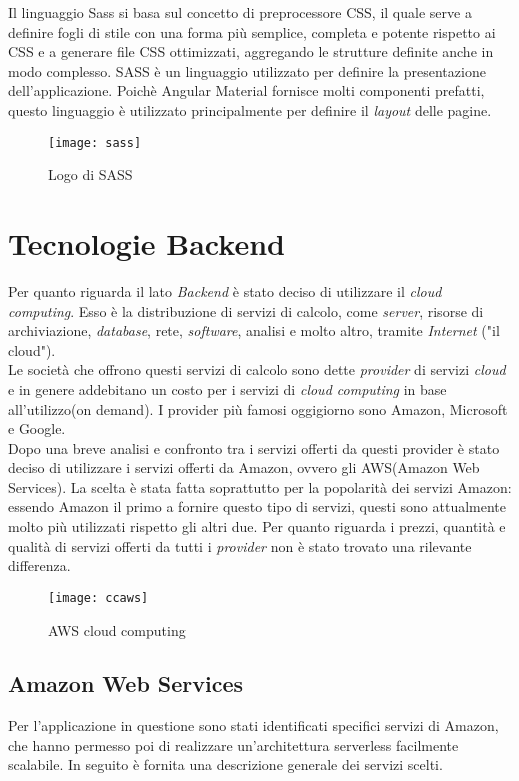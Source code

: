 Il linguaggio Sass si basa sul concetto di preprocessore CSS, il quale serve a definire fogli di stile con una forma più semplice, completa e potente rispetto ai CSS e a generare file CSS ottimizzati, aggregando le strutture definite anche in modo complesso. SASS è un linguaggio utilizzato per definire la presentazione dell'applicazione. Poichè Angular Material fornisce molti componenti prefatti, questo linguaggio è utilizzato principalmente per definire il \emph{layout} delle pagine. 
\begin{figure}[!h] 
	\centering 
	\texttt{[image: sass]}
	\caption{Logo di SASS}
\end{figure}

\section{Tecnologie Backend}
Per quanto riguarda il lato \emph{Backend} è stato deciso di utilizzare il \emph{cloud computing}. Esso è la distribuzione di servizi di calcolo, come \emph{server}, risorse di archiviazione, \emph{database}, rete, \emph{software}, analisi e molto altro, tramite \emph{Internet} ("il cloud"). 
\\

Le società che offrono questi servizi di calcolo sono dette \emph{provider} di servizi \emph{cloud} e in genere addebitano un costo per i servizi di \emph{cloud computing} in base all'utilizzo(on demand). I provider più famosi oggigiorno sono Amazon, Microsoft e Google. 
\\

Dopo una breve analisi e confronto tra i servizi offerti da questi provider è stato deciso di utilizzare i servizi offerti da Amazon, ovvero gli AWS(Amazon Web Services). La scelta è stata fatta soprattutto per la popolarità dei servizi Amazon: essendo Amazon il primo a fornire questo tipo di servizi, questi sono attualmente molto più utilizzati rispetto gli altri due. Per quanto riguarda i prezzi, quantità e qualità di servizi offerti da tutti i \emph{provider} non è stato trovato una rilevante differenza. 
\begin{figure}[!h] 
	\centering 
	\texttt{[image: ccaws]}
	\caption{AWS cloud computing}
\end{figure} 
\subsection{Amazon Web Services}
Per l'applicazione in questione sono stati identificati specifici servizi di Amazon, che hanno permesso poi di realizzare un'architettura \gls{serverless} facilmente scalabile. In seguito è fornita una descrizione generale dei servizi scelti.

